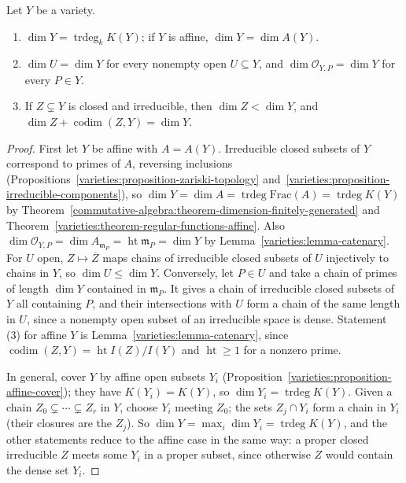\begin{theorem}\label{varieties:theorem-dimension}
Let $Y$ be a variety.
\begin{enumerate}
\item $\dim Y = \operatorname{trdeg}_kK(Y)$; if $Y$ is affine, $\dim Y = \dim A(Y)$.
\item $\dim U = \dim Y$ for every nonempty open $U \subseteq Y$, and $\dim\mathcal{O}_{Y,P} = \dim Y$ for every $P \in Y$.
\item If $Z \subsetneq Y$ is closed and irreducible, then $\dim Z < \dim Y$, and $\dim Z + \operatorname{codim}(Z, Y) = \dim Y$.
\end{enumerate}
\end{theorem}

\begin{proof}
First let $Y$ be affine with $A = A(Y)$. Irreducible closed subsets of $Y$ correspond to primes of $A$, reversing inclusions
(Propositions~\ref{varieties:proposition-zariski-topology} and~\ref{varieties:proposition-irreducible-components}), so
$\dim Y = \dim A = \operatorname{trdeg}\mathrm{Frac}(A) = \operatorname{trdeg}K(Y)$ by
Theorem~\ref{commutative-algebra:theorem-dimension-finitely-generated} and Theorem~\ref{varieties:theorem-regular-functions-affine}. Also
$\dim\mathcal{O}_{Y,P} = \dim A_{\mathfrak{m}_P} = \operatorname{ht}\mathfrak{m}_P = \dim Y$ by Lemma~\ref{varieties:lemma-catenary}. For $U$ open,
$Z \mapsto \overline Z$ maps chains of irreducible closed subsets of $U$ injectively to chains in $Y$, so $\dim U \leq \dim Y$. Conversely, let
$P \in U$ and take a chain of primes of length $\dim Y$ contained in $\mathfrak{m}_P$. It gives a chain of irreducible closed subsets of $Y$ all
containing $P$, and their intersections with $U$ form a chain of the same length in $U$, since a nonempty open subset of an irreducible space is
dense. Statement (3) for affine $Y$ is Lemma~\ref{varieties:lemma-catenary}, since $\operatorname{codim}(Z, Y) = \operatorname{ht}I(Z)/I(Y)$ and
$\operatorname{ht} \geq 1$ for a nonzero prime.

In general, cover $Y$ by affine open subsets $Y_i$ (Proposition~\ref{varieties:proposition-affine-cover}); they have
$K(Y_i) = K(Y)$, so $\dim Y_i = \operatorname{trdeg}K(Y)$. Given a chain $Z_0 \subsetneq \cdots \subsetneq Z_r$ in $Y$, choose $Y_i$ meeting $Z_0$; the
sets $Z_j \cap Y_i$ form a chain in $Y_i$ (their closures are the $Z_j$). So $\dim Y = \max_i\dim Y_i = \operatorname{trdeg}K(Y)$, and the other
statements reduce to the affine case in the same way: a proper closed irreducible $Z$ meets some $Y_i$ in a proper subset, since otherwise $Z$
would contain the dense set $Y_i$.
\end{proof}

